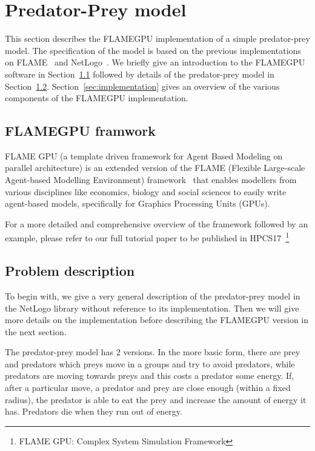 \section{Predator-Prey model}
This section describes the FLAMEGPU implementation of a simple predator-prey model. The specification of the model is based on the previous implementations on FLAME~\cite{Poulter} and NetLogo~\cite{netlogo}. We briefly give an introduction to the FLAMEGPU software in Section~\ref{sec:flamegpu} followed by details of the predator-prey model in Section~\ref{sec:preypredator}. Section~\ref{sec:implementation} gives an overview of the various components of the FLAMEGPU implementation.

\subsection{FLAMEGPU framwork}\label{sec:flamegpu}
FLAME GPU (a template driven framework for Agent Based Modeling on parallel architecture) is an extended version of the FLAME (Flexible Large-scale Agent-based Modelling Environment) framework~\cite{Coakley2016} that enables modellers from various disciplines like economics, biology and social sciences to easily write agent-based models, specifically for Graphics Processing Units (GPUs).

For a  more detailed and comprehensive overview of the framework followed by an example, please refer to our full tutorial paper to be published in HPCS17~\footnote{FLAME GPU: Complex System Simulation Framework}

\subsection{Problem description}\label{sec:preypredator}
To begin with, we give a very general description of the predator-prey model in the NetLogo library without reference to its implementation. Then we will give more details on the
implementation before describing the FLAMEGPU version in the next section.

The predator-prey model has 2 versions. In the more basic form, there are prey
and predators which preys move in a groups and try to avoid predators, while predators are moving towards preys and this costs a predator some energy. If, after a particular move, a predator and prey are close enough (within a fixed radius), the predator is able to eat the prey and increase the amount of energy it has. Predators die when they run out of energy.

